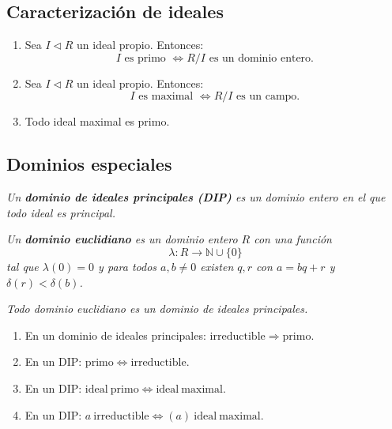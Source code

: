 \documentclass[11pt,letterpaper]{article}
\begin{document}
\subsection{Caracterización de ideales}
\begin{tcolorbox}[colback=CINVESTAV!10, colframe=CINVESTAV, title=\textcolor{white}{Caracterizaci\'on de ideales}]
\begin{enumerate}
    \item Sea $I \triangleleft R$ un ideal propio. Entonces:
    \[
    I \text{ es primo } \iff R/I \text{ es un dominio entero}.
    \]
    \item Sea $I \triangleleft R$ un ideal propio. Entonces:
    \[
    I \text{ es maximal } \iff R/I \text{ es un campo}.
    \]
    \item Todo ideal maximal es primo.
\end{enumerate}
\end{tcolorbox}

\subsection{Dominios especiales}

\begin{tcolorbox}[colback=CINVESTAV!10, colframe=CINVESTAV, title=\textcolor{white}{Dominio de ideales principales}]
\textit{
Un \textbf{dominio de ideales principales (DIP)} es un dominio entero en el que todo ideal es principal.
}
\end{tcolorbox}

\begin{tcolorbox}[colback=CINVESTAV!10, colframe=CINVESTAV, title=\textcolor{white}{Dominio Euclidiano}]
\textit{
Un \textbf{dominio euclidiano} es un dominio entero $R$ con una función
\[
\lambda : R \to \mathbb{N}\cup\{0\}
\]
tal que $\lambda(0)=0$ y para todos $a,b \neq 0$ existen $q,r$ con $a=bq+r$ y $\delta(r)<\delta(b)$.
}
\end{tcolorbox}

\begin{tcolorbox}[colback=CINVESTAV!10, colframe=CINVESTAV, title=\textcolor{white}{Teorema de representaci\'on}]
\textit{
Todo dominio euclidiano es un dominio de ideales principales.
}
\end{tcolorbox}
\begin{tcolorbox}[colback=CINVESTAV!10, colframe=CINVESTAV, title=\textcolor{white}{Implicaciones b\'asicas}]
\begin{enumerate}
\item En un dominio de ideales principales: $\mathrm{irreductible} \Longrightarrow \mathrm{primo}$.
\item En un DIP: $\mathrm{primo} \Longleftrightarrow \mathrm{irreductible}$.
\item En un DIP: $\mathrm{ideal\ primo} \Longleftrightarrow \mathrm{ideal\ maximal}$.
\item En un DIP: $a\ \mathrm{irreductible} \Longleftrightarrow (a)\ \mathrm{ideal\ maximal}$.
\end{enumerate}
\end{tcolorbox}
\end{document}
